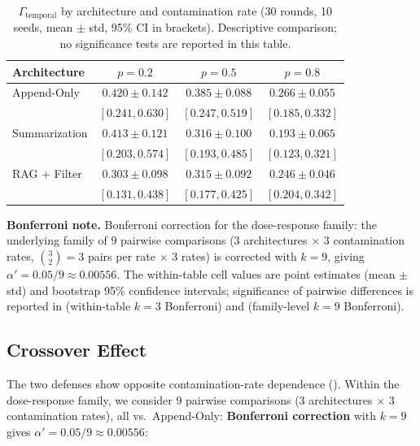 \documentclass[11pt]{article}
\begin{document}
\begin{table}[htbp]
\centering
\caption{$\Gamma_{\text{temporal}}$ by architecture and contamination rate (30 rounds, 10 seeds, mean $\pm$ std, 95\% CI in brackets). Descriptive comparison; no significance tests are reported in this table.}
\label{tab:dose-response}
\begin{tabular}{lccc}
\toprule
Architecture & $p=0.2$ & $p=0.5$ & $p=0.8$ \\
\midrule
Append-Only & $0.420 \pm 0.142$ & $0.385 \pm 0.088$ & $0.266 \pm 0.055$ \\
 & $[0.241, 0.630]$ & $[0.247, 0.519]$ & $[0.185, 0.332]$ \\
Summarization & $0.413 \pm 0.121$ & $0.316 \pm 0.100$ & $0.193 \pm 0.065$ \\
 & $[0.203, 0.574]$ & $[0.193, 0.485]$ & $[0.123, 0.321]$ \\
RAG + Filter & $0.303 \pm 0.098$ & $0.315 \pm 0.092$ & $0.246 \pm 0.046$ \\
 & $[0.131, 0.438]$ & $[0.177, 0.425]$ & $[0.204, 0.342]$ \\
\bottomrule
\end{tabular}
\par\smallskip
{\small\textbf{Bonferroni note.} Bonferroni correction for the dose-response family: the underlying family of $9$ pairwise comparisons ($3$ architectures $\times$ $3$ contamination rates, $\binom{3}{2}=3$ pairs per rate $\times$ $3$ rates) is corrected with $k=9$, giving $\alpha' = 0.05/9 \approx 0.00556$. The within-table cell values are point estimates (mean $\pm$ std) and bootstrap 95\% confidence intervals; significance of pairwise differences is reported in  (within-table $k=3$ Bonferroni) and  (family-level $k=9$ Bonferroni).}
\end{table}

\subsection{Crossover Effect}
\label{sec:crossover}

The two defenses show opposite contamination-rate dependence (). Within the dose-response family, we consider $9$ pairwise comparisons (3 architectures $\times$ 3 contamination rates), all vs.\ Append-Only: \textbf{Bonferroni correction} with $k=9$ gives $\alpha' = 0.05/9 \approx 0.00556$:
\end{document}
